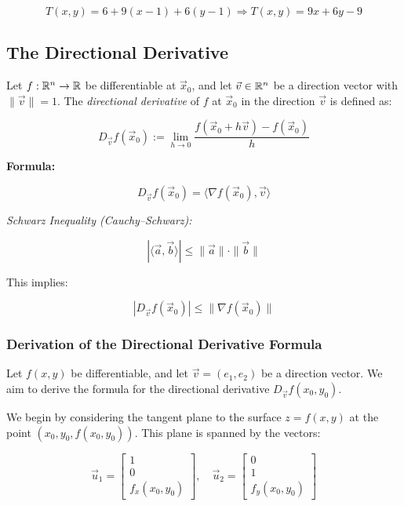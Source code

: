 \[
    T(x, y) = 6 + 9(x - 1) + 6(y - 1)
    \Rightarrow T(x, y) = 9x + 6y - 9
\]

\subsection{The Directional Derivative}

Let \( f : \mathbb{R}^n \to \mathbb{R} \) be differentiable at \( \vec{x}_0 \), 
and let \( \vec{v} \in \mathbb{R}^n \) be a direction vector with \( \|\vec{v}\| = 1 \). The 
\emph{directional derivative} of \(f\) at \( \vec{x}_0 \) in the direction \( \vec{v} \) is defined as:

\[
    D_{\vec{v}}f(\vec{x}_0) := \lim_{h \to 0} \frac{f(\vec{x}_0 + h\vec{v}) - f(\vec{x}_0)}{h}
\]

\textbf{Formula:}

\[
    D_{\vec{v}}f(\vec{x}_0) = \langle \nabla f(\vec{x}_0), \vec{v} \rangle
\]

\emph{Schwarz Inequality (Cauchy–Schwarz):}

\[
    |\langle \vec{a}, \vec{b} \rangle| \le \|\vec{a}\| \cdot \|\vec{b}\|
\]

This implies:

\[
    |D_{\vec{v}}f(\vec{x}_0)| \le \|\nabla f(\vec{x}_0)\|
\]

\subsubsection{Derivation of the Directional Derivative Formula}

Let \( f(x, y) \) be differentiable, and let \( \vec{v} = (e_1, e_2) \) be a direction vector. We aim to 
derive the formula for the directional derivative \( D_{\vec{v}} f(x_0, y_0) \).

We begin by considering the tangent plane to the surface \( z = f(x, y) \) at the point 
\( (x_0, y_0, f(x_0, y_0)) \). This plane is spanned by the vectors:

\[
    \vec{u}_1 = 
    \begin{bmatrix}
    1 \\
    0 \\
    f_x(x_0, y_0)
    \end{bmatrix}, \quad
    \vec{u}_2 = 
    \begin{bmatrix}
    0 \\
    1 \\
    f_y(x_0, y_0)
    \end{bmatrix}
\]

